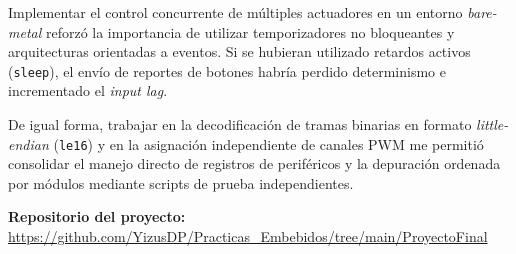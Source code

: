 \documentclass[conference]{IEEEtran}
\begin{document}
Implementar el control concurrente de múltiples actuadores en un entorno \textit{bare-metal} reforzó la importancia de utilizar temporizadores no bloqueantes y arquitecturas orientadas a eventos. Si se hubieran utilizado retardos activos (\texttt{sleep}), el envío de reportes de botones habría perdido determinismo e incrementado el \textit{input lag}.

De igual forma, trabajar en la decodificación de tramas binarias en formato \textit{little-endian} (\texttt{le16}) y en la asignación independiente de canales PWM me permitió consolidar el manejo directo de registros de periféricos y la depuración ordenada por módulos mediante scripts de prueba independientes.

\vspace{0.3cm}
\noindent\textbf{Repositorio del proyecto:} \\
\url{https://github.com/YizusDP/Practicas_Embebidos/tree/main/ProyectoFinal}
\end{document}
